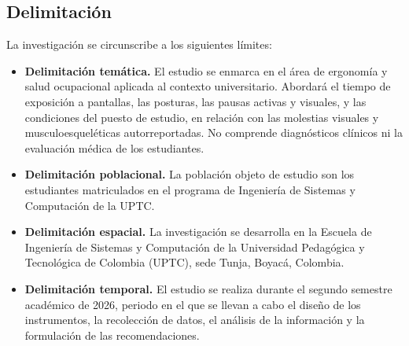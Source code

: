 \subsection{Delimitación}

La investigación se circunscribe a los siguientes límites:

\begin{itemize}
  \item \textbf{Delimitación temática.} El estudio se enmarca en el área de ergonomía y
  salud ocupacional aplicada al contexto universitario. Abordará el tiempo de exposición a
  pantallas, las posturas, las pausas activas y visuales, y las condiciones del puesto de
  estudio, en relación con las molestias visuales y musculoesqueléticas autorreportadas.
  No comprende diagnósticos clínicos ni la evaluación médica de los estudiantes.
  \item \textbf{Delimitación poblacional.} La población objeto de estudio son los
  estudiantes matriculados en el programa de Ingeniería de Sistemas y Computación de la
  UPTC.
  \item \textbf{Delimitación espacial.} La investigación se desarrolla en la Escuela de
  Ingeniería de Sistemas y Computación de la Universidad Pedagógica y Tecnológica de
  Colombia (UPTC), sede Tunja, Boyacá, Colombia.
  \item \textbf{Delimitación temporal.} El estudio se realiza durante el segundo semestre
  académico de 2026, periodo en el que se llevan a cabo el diseño de los instrumentos, la
  recolección de datos, el análisis de la información y la formulación de las
  recomendaciones.
\end{itemize}
